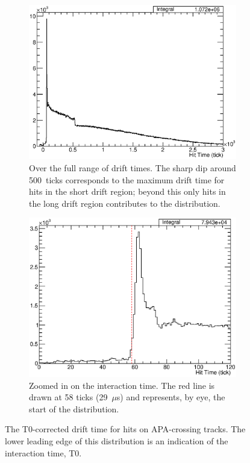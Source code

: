 \begin{figure}
  \centering
  \begin{subfigure}[t]{0.48\linewidth}
    \centering
    \includegraphics[width=\textwidth]{HitTimes.eps}
    \caption{Over the full range of drift times.  The sharp dip around 500~ticks corresponds to the maximum drift time for hits in the short drift region; beyond this only hits in the long drift region contributes to the distribution.}
    \label{fig:HitTimesRange}
  \end{subfigure}
  \hfill
  \begin{subfigure}[t]{0.48\linewidth}
    \centering
    \includegraphics[width=\textwidth]{HitTimesZoom.eps}
    \caption{Zoomed in on the interaction time.  The red line is drawn at 58 ticks (29~$\mu$s) and represents, by eye, the start of the distribution.}
    \label{fig:HitTimesZoom}
  \end{subfigure}
  \caption[The T0-corrected drift time for hits on APA-crossing tracks.]{The T0-corrected drift time for hits on APA-crossing tracks.  The lower leading edge of this distribution is an indication of the interaction time, T0.}
  \label{fig:HitTimes}
\end{figure}

